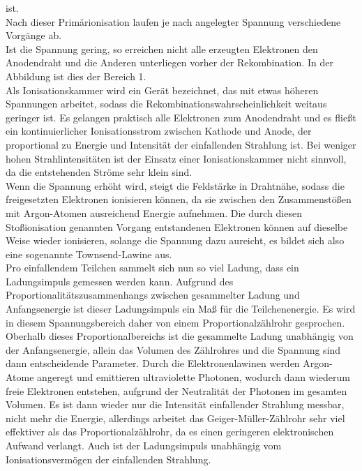 ist. \\
Nach dieser Primärionisation laufen je nach angelegter Spannung verschiedene
Vorgänge ab.\\
Ist die Spannung gering, so erreichen nicht alle erzeugten Elektronen den Anodendraht
und die Anderen unterliegen vorher der Rekombination. In der Abbildung ist
dies der Bereich 1.\\
Als Ionisationskammer wird ein Gerät bezeichnet, das mit etwas höheren Spannungen
arbeitet, sodass die Rekombinationswahrscheinlichkeit weitaus geringer ist.
Es gelangen praktisch alle Elektronen zum Anodendraht und es fließt ein kontinuierlicher
Ionisationsstrom zwischen Kathode und Anode, der proportional zu Energie und
Intensität der einfallenden Strahlung ist. Bei weniger hohen Strahlintensitäten
ist der Einsatz einer Ionisationskammer nicht sinnvoll, da die entstehenden Ströme 
sehr klein sind.\\
Wenn die Spannung erhöht wird, steigt die Feldstärke in Drahtnähe, sodass die 
freigesetzten Elektronen ionisieren können, da sie zwischen den Zusammenstößen 
mit Argon-Atomen ausreichend Energie aufnehmen. Die durch diesen Stoßionisation genannten
Vorgang entstandenen Elektronen können auf dieselbe Weise wieder ionisieren,
solange die Spannung dazu aureicht, es bildet sich also eine sogenannte Townsend-Lawine
aus. \\
Pro einfallendem Teilchen sammelt sich nun so viel Ladung, dass ein Ladungsimpuls 
gemessen werden kann. Aufgrund des Proportionalitätszusammenhangs zwischen
gesammelter Ladung und Anfangsenergie ist dieser Ladungsimpuls ein Maß für 
die Teilchenenergie. Es wird in diesem Spannungsbereich daher von einem 
Proportionalzählrohr gesprochen.\\
Oberhalb dieses Proportionalbereichs ist die gesammelte Ladung unabhängig 
von der Anfangsenergie, allein das Volumen des Zählrohres und die Spannung sind
dann entscheidende Parameter. Durch die Elektronenlawinen werden Argon-Atome angeregt
und emittieren ultraviolette Photonen, wodurch dann wiederum 
freie Elektronen entstehen, aufgrund der Neutralität der Photonen im gesamten Volumen.
Es ist dann wieder nur die Intensität einfallender Strahlung messbar, nicht mehr
die Energie, allerdings arbeitet das Geiger-Müller-Zählrohr sehr viel effektiver als
das Proportionalzählrohr, da es einen geringeren elektronischen Aufwand verlangt.
Auch ist der Ladungsimpuls unabhängig vom Ionisationsvermögen der einfallenden Strahlung.

